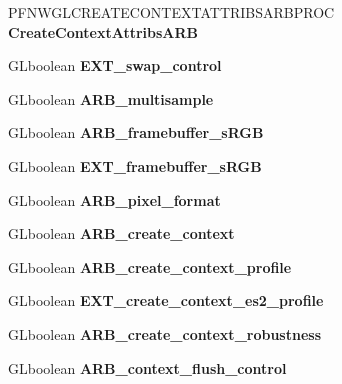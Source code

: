 \begin{DoxyCompactItemize}
\item 
\hypertarget{struct__GLFWcontextWGL_a6d820a8aff8186b6e30b1b63b49d80a9}{}P\+F\+N\+W\+G\+L\+C\+R\+E\+A\+T\+E\+C\+O\+N\+T\+E\+X\+T\+A\+T\+T\+R\+I\+B\+S\+A\+R\+B\+P\+R\+O\+C {\bfseries Create\+Context\+Attribs\+A\+R\+B}\label{struct__GLFWcontextWGL_a6d820a8aff8186b6e30b1b63b49d80a9}

\item 
\hypertarget{struct__GLFWcontextWGL_abf9e882ddbf84373f70a1362b53379f6}{}G\+Lboolean {\bfseries E\+X\+T\+\_\+swap\+\_\+control}\label{struct__GLFWcontextWGL_abf9e882ddbf84373f70a1362b53379f6}

\item 
\hypertarget{struct__GLFWcontextWGL_a087833f9d372612f02f65b33830661ca}{}G\+Lboolean {\bfseries A\+R\+B\+\_\+multisample}\label{struct__GLFWcontextWGL_a087833f9d372612f02f65b33830661ca}

\item 
\hypertarget{struct__GLFWcontextWGL_a26138275558d7f0924a034f1cd0aec16}{}G\+Lboolean {\bfseries A\+R\+B\+\_\+framebuffer\+\_\+s\+R\+G\+B}\label{struct__GLFWcontextWGL_a26138275558d7f0924a034f1cd0aec16}

\item 
\hypertarget{struct__GLFWcontextWGL_af6d3c09622b439fd35b3dc7a0c81b36d}{}G\+Lboolean {\bfseries E\+X\+T\+\_\+framebuffer\+\_\+s\+R\+G\+B}\label{struct__GLFWcontextWGL_af6d3c09622b439fd35b3dc7a0c81b36d}

\item 
\hypertarget{struct__GLFWcontextWGL_ab366fdd4f32c7afee87b1d6761787e90}{}G\+Lboolean {\bfseries A\+R\+B\+\_\+pixel\+\_\+format}\label{struct__GLFWcontextWGL_ab366fdd4f32c7afee87b1d6761787e90}

\item 
\hypertarget{struct__GLFWcontextWGL_aca5ca42c2ea1552209c6452d4c79d8b4}{}G\+Lboolean {\bfseries A\+R\+B\+\_\+create\+\_\+context}\label{struct__GLFWcontextWGL_aca5ca42c2ea1552209c6452d4c79d8b4}

\item 
\hypertarget{struct__GLFWcontextWGL_a674dcdc5e27b77b726a2791a3a7e3b9a}{}G\+Lboolean {\bfseries A\+R\+B\+\_\+create\+\_\+context\+\_\+profile}\label{struct__GLFWcontextWGL_a674dcdc5e27b77b726a2791a3a7e3b9a}

\item 
\hypertarget{struct__GLFWcontextWGL_a928b257c8e79add3f2728270fdc599d2}{}G\+Lboolean {\bfseries E\+X\+T\+\_\+create\+\_\+context\+\_\+es2\+\_\+profile}\label{struct__GLFWcontextWGL_a928b257c8e79add3f2728270fdc599d2}

\item 
\hypertarget{struct__GLFWcontextWGL_adeedf275743b1b12e9498ece7c8a19a2}{}G\+Lboolean {\bfseries A\+R\+B\+\_\+create\+\_\+context\+\_\+robustness}\label{struct__GLFWcontextWGL_adeedf275743b1b12e9498ece7c8a19a2}

\item 
\hypertarget{struct__GLFWcontextWGL_a2ce43b4a38e2c8a5155e3deb0d02e226}{}G\+Lboolean {\bfseries A\+R\+B\+\_\+context\+\_\+flush\+\_\+control}\label{struct__GLFWcontextWGL_a2ce43b4a38e2c8a5155e3deb0d02e226}

\end{DoxyCompactItemize}



